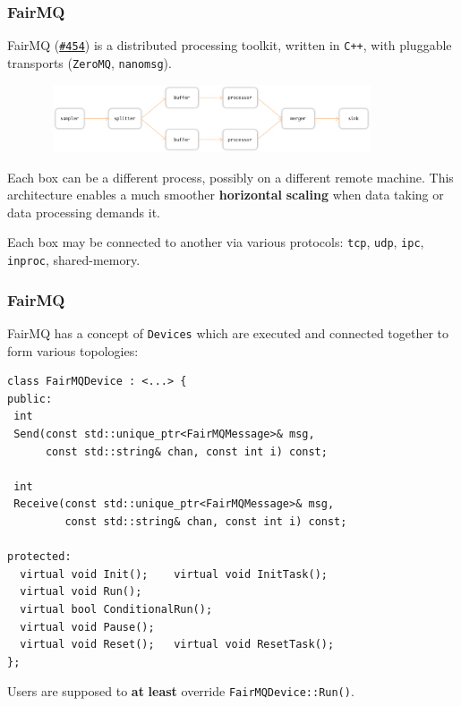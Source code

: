 \documentclass[9pt]{beamer}
\newcommand{\myblue} [1] {{\color{blue}#1}}
\begin{document}
\begin{frame}[fragile]
\frametitle{FairMQ}


FairMQ (\myblue{\href{https://indico.cern.ch/event/587955/timetable/?view=standard\#454-alfa-alice-fair-new-messag}{\texttt{\#454}}}) is a distributed processing toolkit, written in \texttt{C++}, with pluggable transports (\texttt{ZeroMQ}, \texttt{nanomsg}).


\begin{figure}[h]
\begin{center}
\includegraphics[width=10cm,height=2cm]{_figs/fairmq-example-topology.png}
\end{center}

\end{figure}

Each box can be a different process, possibly on a different remote machine.
This architecture enables a much smoother \textbf{horizontal} \textbf{scaling} when data taking or data processing demands it.


Each box may be connected to another via various protocols: \texttt{tcp}, \texttt{udp}, \texttt{ipc}, \texttt{inproc}, shared-memory.



\end{frame}

\begin{frame}[fragile]
\frametitle{FairMQ}


FairMQ has a concept of \texttt{Devices} which are executed and connected together to form various topologies:



\begin{verbatim}
class FairMQDevice : <...> {
public:
 int
 Send(const std::unique_ptr<FairMQMessage>& msg,
      const std::string& chan, const int i) const;

 int
 Receive(const std::unique_ptr<FairMQMessage>& msg,
         const std::string& chan, const int i) const;

protected:
  virtual void Init();    virtual void InitTask();
  virtual void Run();
  virtual bool ConditionalRun();
  virtual void Pause();
  virtual void Reset();   virtual void ResetTask();
};
\end{verbatim}


Users are supposed to \textbf{at} \textbf{least} override \texttt{FairMQDevice::Run()}.



\end{frame}
\end{document}
